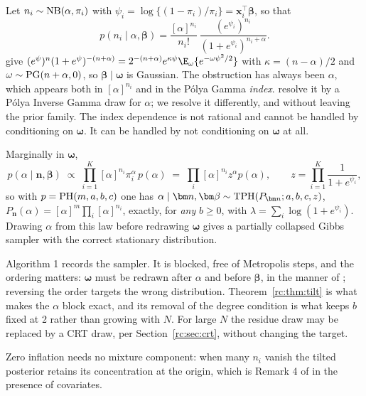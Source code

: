 Let $n_i\sim\mathrm{NB}(\alpha,\pi_i)$ with $\psi_i=\log\{(1-\pi_i)/\pi_i\}=\bm x_i^\top\bm\beta$, so that
\[
p(n_i\mid\alpha,\bm\beta)=\frac{[\alpha]^{n_i}}{n_i!}\,\frac{(e^{\psi_i})^{n_i}}{(1+e^{\psi_i})^{n_i+\alpha}}.
\]
\citet{rc:polson2013} give $(e^\psi)^n(1+e^\psi)^{-(n+\alpha)}=2^{-(n+\alpha)}e^{\kappa\psi}\E_\omega\{e^{-\omega\psi^2/2}\}$ with $\kappa=(n-\alpha)/2$ and $\omega\sim\mathrm{PG}(n+\alpha,0)$, so $\bm\beta\mid\bm\omega$ is Gaussian. The obstruction has always been $\alpha$, which appears both in $[\alpha]^{n_i}$ and in the P\'olya Gamma \emph{index}. \citet{rc:he2019} resolve it by a P\'olya Inverse Gamma draw for $\alpha$; we resolve it differently, and without leaving the prior family. The index dependence is not rational and cannot be handled by conditioning on $\bm\omega$. It can be handled by not conditioning on $\bm\omega$ at all.

\begin{proposition}\label{rc:prop:dispersion}
Marginally in $\bm\omega$,
\[
p(\alpha\mid\bm n,\bm\beta)\;\propto\;\prod_{i=1}^K[\alpha]^{n_i}\pi_i^\alpha\,p(\alpha)\;=\;\prod_i[\alpha]^{n_i}z^\alpha p(\alpha),\qquad z=\prod_{i=1}^K\frac{1}{1+e^{\psi_i}},
\]
so with $p=\mathrm{PH}(m,a,b,c)$ one has $\alpha\mid\bm n,\bm\beta\sim\rcTPH(P_{\bm n};a,b,c,z)$, $P_{\bm n}(\alpha)=[\alpha]^m\prod_i[\alpha]^{n_i}$, exactly, for \emph{any} $b\ge0$, with $\lambda=\sum_i\log(1+e^{\psi_i})$. Drawing $\alpha$ from this law before redrawing $\bm\omega$ gives a partially collapsed Gibbs sampler with the correct stationary distribution.
\end{proposition}

Algorithm 1 records the sampler. It is blocked, free of Metropolis steps, and the ordering matters: $\bm\omega$ must be redrawn after $\alpha$ and before $\bm\beta$, in the manner of \citet{rc:vandyk2008}; reversing the order targets the wrong distribution. Theorem~\ref{rc:thm:tilt} is what makes the $\alpha$ block exact, and its removal of the degree condition is what keeps $b$ fixed at 2 rather than growing with $N$. For large $N$ the residue draw may be replaced by a CRT draw, per Section~\ref{rc:sec:crt}, without changing the target.

Zero inflation needs no mixture component: when many $n_i$ vanish the tilted posterior retains its concentration at the origin, which is Remark 4 of \citet{rc:wang2024} in the presence of covariates.

